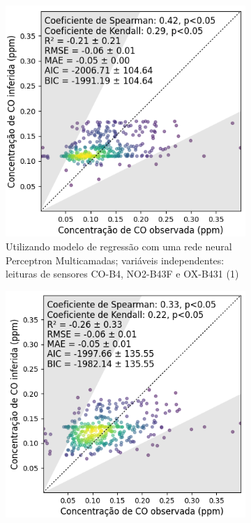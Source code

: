 \begin{figure}[h!]
    \centering
    \caption{Gráfico de dispersão das leituras do múltiplos sensores e a estação de referência para medição de \acrshort{co}}
    \begin{subfigure}{0.495\textwidth}
        \includegraphics[width=\textwidth]{chapters/4-CALIBRAÇÃO MÚLTIPLOS SENSORES/Figuras/CO-co-no2-o31-mlp-Regression.png}
        \caption{Utilizando modelo de regressão com uma rede neural Perceptron Multicamadas; variáveis independentes: leituras de sensores CO-B4, NO2-B43F e OX-B431 (1)}
        \label{fig:data-co-no2-o31-reference-corr-MLP}
    \end{subfigure}
    \hfill
    \begin{subfigure}{0.495\textwidth}
        \includegraphics[width=\textwidth]{chapters/4-CALIBRAÇÃO MÚLTIPLOS SENSORES/Figuras/CO-co-o31-pm10-knn-Regression.png}

\end{subfigure}
\end{figure}
